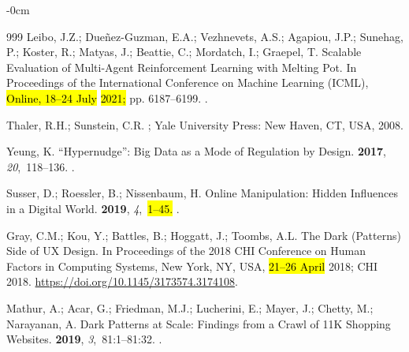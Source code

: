 \documentclass[mca,article,accept,pdftex,oneauthor]{Definitions/mdpi}
\begin{document}
\begin{adjustwidth}{-\extralength}{0cm}
\begin{thebibliography}{999}
Leibo, J.Z.; Due{\~n}ez-Guzman, E.A.; Vezhnevets, A.S.; Agapiou, J.P.; Sunehag,
  P.; Koster, R.; Matyas, J.; Beattie, C.; Mordatch, I.; Graepel, T.
\newblock Scalable Evaluation of Multi-Agent Reinforcement Learning with
  Melting Pot.
\newblock In Proceedings of the International Conference on Machine Learning
  (ICML), \hl{Online, 18--24 July} \hl{2021;} %
 pp. 6187--6199.
.

Thaler, R.H.; Sunstein, C.R.
;
  Yale University Press: New Haven, CT,  USA, 2008.

Yeung, K.
\newblock ``Hypernudge'': Big Data as a Mode of Regulation by Design.
 {\bf 2017}, {\em
  20},~118--136.
.

Susser, D.; Roessler, B.; Nissenbaum, H.
\newblock Online Manipulation: Hidden Influences in a Digital World.
 {\bf 2019}, {\em 4},~\hl{1--45.} %
.

Gray, C.M.; Kou, Y.; Battles, B.; Hoggatt, J.; Toombs, A.L.
\newblock The Dark (Patterns) Side of {UX} Design.
\newblock In Proceedings of the 2018 CHI Conference on Human Factors in
  Computing Systems, New York, NY, USA,  \hl{21--26 April} 2018;
\newblock CHI 2018. {\url{https://doi.org/10.1145/3173574.3174108}}.

Mathur, A.; Acar, G.; Friedman, M.J.; Lucherini, E.; Mayer, J.; Chetty, M.;
  Narayanan, A.
\newblock Dark Patterns at Scale: Findings from a Crawl of 11K Shopping
  Websites.
 {\bf
  2019}, {\em 3},~81:1--81:32.
.


\end{thebibliography}
\end{adjustwidth}
\end{document}
